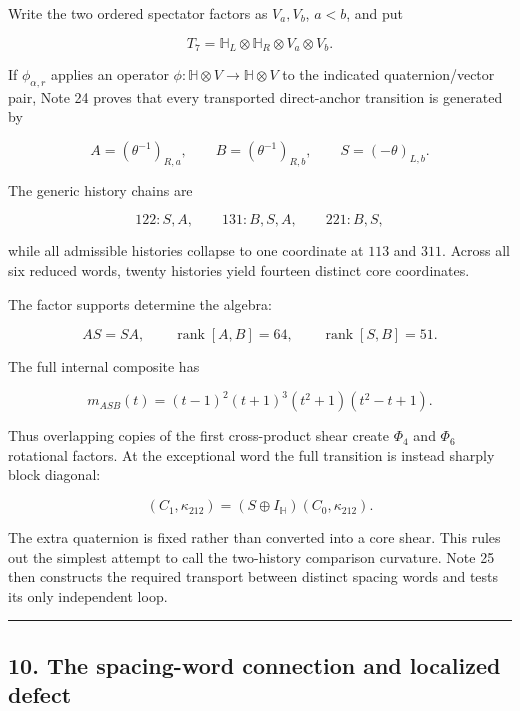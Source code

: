 \documentclass[
  11pt,
  a4paper,
]{article}
\begin{document}
Write the two ordered spectator factors as \(V_a,V_b\), \(a<b\), and put

\[
T_7=\mathbb H_L\otimes\mathbb H_R\otimes V_a\otimes V_b.
\tag{9.1}
\]

If \(\phi_{\alpha,r}\) applies an operator
\(\phi:\mathbb H\otimes V\to\mathbb H\otimes V\) to the indicated
quaternion/vector pair, Note 24 proves that every transported
direct-anchor transition is generated by

\[
\boxed{
A=(\theta^{-1})_{R,a},
\qquad
B=(\theta^{-1})_{R,b},
\qquad
S=(-\theta)_{L,b}.
}
\tag{9.2}
\]

The generic history chains are

\[
\boxed{
122:S,A,
\qquad
131:B,S,A,
\qquad
221:B,S,
}
\tag{9.3}
\]

while all admissible histories collapse to one coordinate at \(113\) and
\(311\). Across all six reduced words, twenty histories yield fourteen
distinct core coordinates.

The factor supports determine the algebra:

\[
AS=SA,
\qquad
\operatorname{rank}[A,B]=64,
\qquad
\operatorname{rank}[S,B]=51.
\tag{9.4}
\]

The full internal composite has

\[
\boxed{
m_{ASB}(t)
=(t-1)^2(t+1)^3(t^2+1)(t^2-t+1).
}
\tag{9.5}
\]

Thus overlapping copies of the first cross-product shear create
\(\Phi_4\) and \(\Phi_6\) rotational factors. At the exceptional word
the full transition is instead sharply block diagonal:

\[
\boxed{
(C_1,\kappa_{212})
=
(S\oplus I_{\mathbb H})(C_0,\kappa_{212}).
}
\tag{9.6}
\]

The extra quaternion is fixed rather than converted into a core shear.
This rules out the simplest attempt to call the two-history comparison
curvature. Note 25 then constructs the required transport between
distinct spacing words and tests its only independent loop.

\begin{center}\rule{0.5\linewidth}{0.5pt}\end{center}

\hypertarget{the-spacing-word-connection-and-localized-defect}{%
\subsection{10. The spacing-word connection and localized
defect}\label{the-spacing-word-connection-and-localized-defect}}
\end{document}
